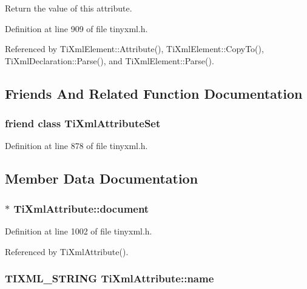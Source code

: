 Return the value of this attribute. 

Definition at line 909 of file tinyxml.h.

Referenced by TiXmlElement::Attribute(), TiXmlElement::CopyTo(), TiXmlDeclaration::Parse(), and TiXmlElement::Parse().

\subsection{Friends And Related Function Documentation}
\hypertarget{class_ti_xml_attribute_a35a7b7f89f708527677d5078d41ce0bf}{
\subsubsection[{TiXmlAttributeSet}]{\setlength{\rightskip}{0pt plus 5cm}friend class {\bf TiXmlAttributeSet}}}
\label{class_ti_xml_attribute_a35a7b7f89f708527677d5078d41ce0bf}


Definition at line 878 of file tinyxml.h.

\subsection{Member Data Documentation}
\hypertarget{class_ti_xml_attribute_ada41d3cff50cd33a78072806f88d4433}{
\subsubsection[{document}]{$\ast$ {\bf TiXmlAttribute::document}}}
\label{class_ti_xml_attribute_ada41d3cff50cd33a78072806f88d4433}


Definition at line 1002 of file tinyxml.h.

Referenced by TiXmlAttribute().\hypertarget{class_ti_xml_attribute_afcbe165f33f08cf9b24daa33f0ee951a}{
\subsubsection[{name}]{\setlength{\rightskip}{0pt plus 5cm}TIXML\_\-STRING {\bf TiXmlAttribute::name}}}
\label{class_ti_xml_attribute_afcbe165f33f08cf9b24daa33f0ee951a}



